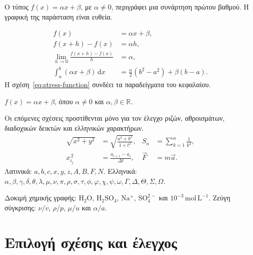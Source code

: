 Ο τύπος \(f(x)=\alpha x+\beta\), με \(\alpha\neq0\), περιγράφει μια συνάρτηση πρώτου βαθμού. Η γραφική της παράσταση είναι ευθεία.

\begin{align}
 f(x)&=\alpha x+\beta,\label{eq:stress-function}\\
 f(x+h)-f(x)&=\alpha h,\\
 \lim_{h\to0}\frac{f(x+h)-f(x)}{h}&=\alpha,\\
 \int_a^b(\alpha x+\beta)\,\mathrm dx
 &=\frac{\alpha}{2}(b^2-a^2)+\beta(b-a).
\end{align}
Η σχέση~\eqref{eq:stress-function} συνδέει τα παραδείγματα του κεφαλαίου.

\begin{definitionbox}
\(f(x)=\alpha x+\beta\), όπου \(\alpha\neq0\) και \(\alpha,\beta\in\mathbb R\).
\end{definitionbox}


Οι επόμενες σχέσεις προστίθενται μόνο για τον έλεγχο ριζών, αθροισμάτων,
διαδοχικών δεικτών και ελληνικών χαρακτήρων.
\begin{align*}
 \sqrt{x^2+y^2}&=\sqrt{\frac{a^2+b^2}{1+t^2}}, &
 S_n&=\sum_{k=1}^{n}\frac{1}{k^2},\\
 x_{i_j}^{\,2}&=\frac{a_{i+1}-a_i}{\Delta t}, &
 \vec F&=m\vec a.
\end{align*}
Λατινικά: $a,\allowbreak b,\allowbreak c,\allowbreak x,\allowbreak y,\allowbreak z,\allowbreak A,\allowbreak B,\allowbreak F,\allowbreak N$.
Ελληνικά: $\alpha,\allowbreak \beta,\allowbreak \gamma,\allowbreak \delta,\allowbreak \theta,\allowbreak \lambda,\allowbreak \mu,\allowbreak \nu,\allowbreak \pi,\allowbreak \rho,\allowbreak \sigma,\allowbreak 
\tau,\allowbreak \phi,\allowbreak \varphi,\allowbreak \chi,\allowbreak \psi,\allowbreak \omega,\allowbreak \Gamma,\allowbreak \Delta,\allowbreak \Theta,\allowbreak \Sigma,\allowbreak \Omega$.

Δοκιμή χημικής γραφής: $\mathrm{H_2O}$, $\mathrm{H_2SO_4}$,
$\mathrm{Na^+}$, $\mathrm{SO_4^{2-}}$ και $10^{-3}\,\mathrm{mol\,L^{-1}}$.
Ζεύγη σύγκρισης: $\nu/v$, $\rho/p$, $\mu/u$ και $\alpha/a$.

\clearpage
\section{Επιλογή σχέσης και έλεγχος}

